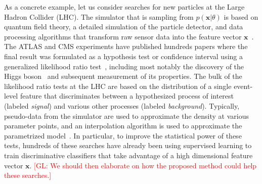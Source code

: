 \documentclass[12pt]{article}
\numberwithin{equation}{section}
\theoremstyle{plain}
\newcommand{\glnote}[1]{\textcolor{red}{[GL: #1]}}
\begin{document}
As a concrete example, let us consider searches for new particles at the Large
Hadron Collider (LHC). The simulator that is sampling from $p(\mathbf{x}|\theta)$ is
based on quantum field theory, a detailed simulation of the particle detector,
and data processing algorithms that transform raw sensor data into the feature
vector $\mathbf{x}$~\citep{Sjostrand:2006za,Agostinelli:2002hh}. The ATLAS and CMS
experiments have published  hundreds papers where the final result was
formulated as a hypothesis test or confidence interval using a generalized
likelihood ratio test~\citep{Cowan:2010js}, including most notably the discovery
of the Higgs boson~\citep{Aad:2012tfa,Chatrchyan:2012ufa} and subsequent
measurement of its properties. The bulk of the likelihood ratio tests at the LHC
are based on the distribution of a single event-level feature that discriminates
between a hypothesized process of interest (labeled \textit{signal}) and various
other processes (labeled \textit{background}). Typically, pseudo-data from the
simulator are used to approximate the density at various parameter points, and
an interpolation algorithm is used to approximate the parametrized
model~\citep{Cranmer:2012sba}. In particular, to improve the statistical power
of these tests, hundreds of these searches have already been using supervised
learning to train discriminative classifiers that take advantage of a high
dimensional feature vector $\mathbf{x}$. \glnote{We should then elaborate on how the
proposed method could help these searches.}
\end{document}
